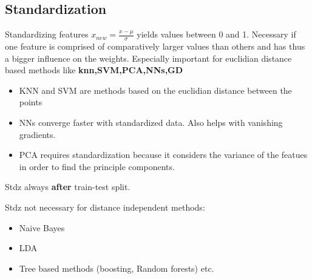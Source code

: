 \subsection{Standardization}

Standardizing features $x_{new} = \frac{x-\mu}{\sigma}$ yields values between 0 and 1. Necessary if one feature is comprised of comparatively larger values than others and has thus a bigger influence on the weights. Especially important for euclidian distance based methods like \textbf{knn,SVM,PCA,NNs,GD}
\begin{itemize}
    \item KNN and SVM are methods based on the euclidian distance between the points 
    \item NNs converge faster with standardized data. Also helps with vanishing gradients.
    \item PCA requires standardization because it considers the variance of the featues in order to find the principle components. 
\end{itemize}
Stdz always \textbf{after} train-test split.

Stdz not necessary for distance independent methods:
\begin{itemize}
    \item Naive Bayes
    \item LDA
    \item Tree based methods (boosting, Random forests) etc.
\end{itemize}